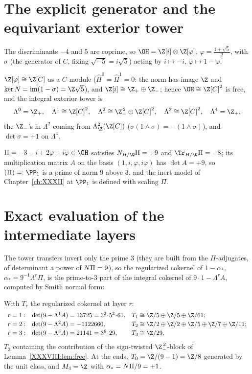 \section{The explicit generator and the equivariant exterior tower}\label{XXXVIII:sec:tower}

The discriminants $-4$ and $5$ are coprime, so $\OH=\Z[i]\otimes\Z[\varphi]$,
$\varphi=\tfrac{1+\sqrt5}2$, with $\sigma$ (the generator of $C$, fixing
$\sqrt{-5}=i\sqrt5$) acting by $i\mapsto-i$, $\varphi\mapsto1-\varphi$.

\begin{lemma}\label{XXXVIII:lem:free}
$\Z[\varphi]\cong\Z[C]$ as a $C$-module ($\hat H^0=\hat H^1=0$: the norm has image $\Z$
and $\ker N=\mathrm{im}(1-\sigma)=\Z\sqrt5$), and $\Z[i]\cong\Z_+\oplus\Z_-$; hence
$\OH\cong\Z[C]^2$ is free, and the integral exterior tower is
\[
\Lambda^0=\Z_+,\quad\Lambda^1\cong\Z[C]^2,\quad
\Lambda^2\cong\Z_-^{\,2}\oplus\Z[C]^2,\quad\Lambda^3\cong\Z[C]^2,\quad\Lambda^4=\Z_+,
\]
the $\Z_-$'s in $\Lambda^2$ coming from $\Lambda^2_\Z(\Z[C])$
($\sigma(1\wedge\sigma)=-(1\wedge\sigma)$), and $\det\sigma=+1$ on $\Lambda^4$.
\end{lemma}

\begin{proposition}\label{XXXVIII:prop:pi}
$\Pi=-3-i+2\varphi+i\varphi\in\OH$ satisfies $\Ns_{H/\Q}\Pi=+9$ and
$\Tr_{H/\Q}\Pi=-8$; its multiplication matrix $A$ on the basis $(1,i,\varphi,i\varphi)$
has $\det A=+9$, so $(\Pi)=:\PP_1$ is a prime of norm $9$ above $3$, and the inert
model of Chapter~\ref{ch:XXXII} at $\PP_1$ is defined with scaling $\Pi$.
\end{proposition}

\section{Exact evaluation of the intermediate layers}\label{XXXVIII:sec:layers}

The tower transfers invert only the prime $3$ (they are built from the $\Pi$-adjugates,
of determinant a power of $N\Pi=9$), so the regularized cokernel of $1-\alpha_*$,
$\alpha_*=9^{-1}\Lambda^r\Pi$, is the prime-to-$3$ part of the integral cokernel of
$9\cdot1-\Lambda^r A$, computed by Smith normal form:

\begin{theorem}\label{XXXVIII:thm:layers}
With $T_r$ the regularized cokernel at layer $r$:
\[
\begin{array}{lll}
r=1: & \det(9-\Lambda^1A)=13725=3^2\!\cdot\!5^2\!\cdot\!61, &
T_1\cong\Z/5\oplus\Z/5\oplus\Z/61;\\[2pt]
r=2: & \det(9-\Lambda^2A)=-1122660, &
T_2\cong\Z/2\oplus\Z/2\oplus\Z/5\oplus\Z/7\oplus\Z/11;\\[2pt]
r=3: & \det(9-\Lambda^3A)=21141=3^6\!\cdot\!29, &
T_3\cong\Z/29,
\end{array}
\]
$T_2$ containing the contribution of the sign-twisted $\Z_-^{\,2}$-block of
Lemma~\ref{XXXVIII:lem:free}. At the ends, $T_0=\Z/(9-1)=\Z/8$ generated by the unit class, and
$M_4=\Z$ with $\alpha_*=N\Pi/9=+1$.
\end{theorem}

